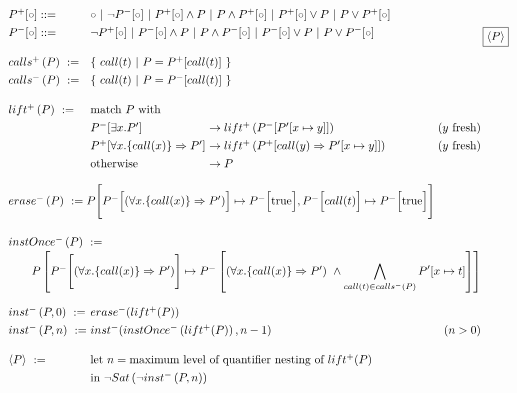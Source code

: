 \documentclass[10pt]{article}
\newcommand{\tcap}[2][-2ex]{\hfill\raisebox{#1}[0ex][0ex]{\fbox{$#2$}}\\[-2\baselineskip]}
\renewcommand{\t}[1]{~\text{\textnormal{#1}}~}
\newcommand{\forallc}[1]{\forall x. \{call(x)\} \Rightarrow #1}
\theoremstyle{definition}
\begin{document}
\[
\arraycolsep=1.6pt\def\arraystretch{1.3}
\begin{array}{llllr}
  P^+[\circ] ::=& \multicolumn{4}{l}{\circ ~|~ \neg P^-[\circ] ~|~ P^+[\circ] \wedge P ~|~ P \wedge P^+[\circ] ~|~ P^+[\circ] \vee P ~|~ P \vee P^+[\circ]} \\
  P^-[\circ] ::=& \multicolumn{4}{l}{\neg P^+[\circ] ~|~ P^-[\circ] \wedge P ~|~ P \wedge P^-[\circ] ~|~ P^-[\circ] \vee P ~|~ P \vee P^-[\circ]} \\[1em]
  calls^{+} \left( P \right ) ~:= & \multicolumn{4}{l}{\left \{~call(t)~|~P = P^+[ call(t)]~\right \}} \\
  calls^{-} \left( P \right ) ~:= & \multicolumn{4}{l}{\left \{~call(t)~|~P = P^-[ call(t)]~\right \}} \\[1em]
  lift^{+} \left( P \right)~:= & \text{match}~P \t{with} \\ & \multicolumn{2}{l}{P^-[\exists x. P']}
                           & \rightarrow lift^{+} \left( P^-[P'[x \mapsto y]] \right)
                           & (y~\text{fresh}) \\
                           &                        \multicolumn{2}{l}{P^+[\forallc{P'}]}
                           & \rightarrow lift^{+} \left( P^+[call(y) \Rightarrow P'[x \mapsto y]] \right)
                           & (y~\text{fresh}) \\
                           &                         \multicolumn{2}{l}{\text{otherwise}}
                           & \rightarrow P \\[1em]
  \multicolumn{5}{l}{erase^{-} \left( P \right) ~:= P \Bigg [P^- \Big [ (\forallc{P'}) \Big] \mapsto P^- \Big[\text{true}\Big], P^- \Big [ call(t) \Big] \mapsto P^- \Big[\text{true}\Big] \Bigg]} \\[2em]
  \multicolumn{5}{l}{instOnce^{-} \left( P \right) ~:=} \\
  \multicolumn{5}{l}{\hspace{2em} P \left [
      P^- \Bigg[ (\forallc{P'}) \Bigg] \mapsto P^- \left [ (\forallc{P'})~\wedge \displaystyle\bigwedge_{call(t) \in calls^{-} ( P )} P'[x \mapsto t] \right ]
  \right]} \\[2em]
  inst^{-} \left( P, 0 \right) ~:= & \multicolumn{4}{l}{erase^{-}(lift^{+}(P))} \\
  inst^{-} \left( P, n \right) ~:= & \multicolumn{3}{l}{inst^{-}(instOnce^{-} \left( lift^{+} ( P ) \right), n - 1)} & (n > 0) \\[1em]
  \langle P \rangle ~:= & \multicolumn{4}{l}{\text{let}~n = \text{maximum level of quantifier nesting of}~lift^{+} ( P )} \\
  & \multicolumn{4}{l}{\text{in}~\neg Sat \left ( \neg inst^{-} \left ( P, n \right) \right)}
\end{array} 
\tcap[32ex]{\langle P \rangle}
\] \\[1em]
\end{document}

